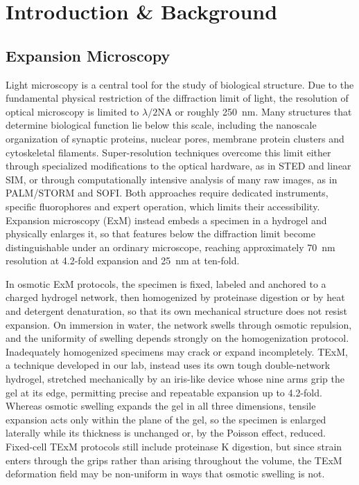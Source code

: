\documentclass[%
 reprint,
 11pt,
 amsmath,amssymb,
 aps,
]{revtex4-2}
\begin{document}
\maketitle

\section{Introduction \& Background}

\subsection{Expansion Microscopy}

Light microscopy is a central tool for the study of biological structure. Due to the fundamental physical restriction of the diffraction limit of light, the resolution of optical microscopy is limited to $\lambda/2\mathrm{NA}$ or roughly 250~nm.\cite{abbe} Many structures that determine biological function lie below this scale, including the nanoscale organization of synaptic proteins, nuclear pores, membrane protein clusters and cytoskeletal filaments.\cite{xu2013actin,schermelleh} Super-resolution techniques overcome this limit either through specialized modifications to the optical hardware, as in STED and linear SIM,\cite{sted,sim} or through computationally intensive analysis of many raw images, as in PALM/STORM and SOFI.\cite{palm,storm,sofi} Both approaches require dedicated instruments, specific fluorophores and expert operation, which limits their accessibility.\cite{schermelleh} Expansion microscopy (ExM) instead embeds a specimen in a hydrogel and physically enlarges it, so that features below the diffraction limit become distinguishable under an ordinary microscope, reaching approximately 70~nm resolution at 4.2-fold expansion\cite{exm} and 25~nm at ten-fold.\cite{magnify}

In osmotic ExM protocols, the specimen is fixed, labeled and anchored to a charged hydrogel network, then homogenized by proteinase digestion or by heat and detergent denaturation, so that its own mechanical structure does not resist expansion.\cite{proexm,magnify} On immersion in water, the network swells through osmotic repulsion,\cite{exm,jcs} and the uniformity of swelling depends strongly on the homogenization protocol. Inadequately homogenized specimens may crack or expand incompletely.\cite{gao,magnify} TExM, a technique developed in our lab, instead uses its own tough double-network hydrogel, stretched mechanically by an iris-like device whose nine arms grip the gel at its edge, permitting precise and repeatable expansion up to 4.2-fold.\cite{texm} Whereas osmotic swelling expands the gel in all three dimensions, tensile expansion acts only within the plane of the gel, so the specimen is enlarged laterally while its thickness is unchanged or, by the Poisson effect, reduced.\cite{texm} Fixed-cell TExM protocols still include proteinase K digestion, but since strain enters through the grips rather than arising throughout the volume, the TExM deformation field may be non-uniform in ways that osmotic swelling is not.\cite{texm}
\end{document}
